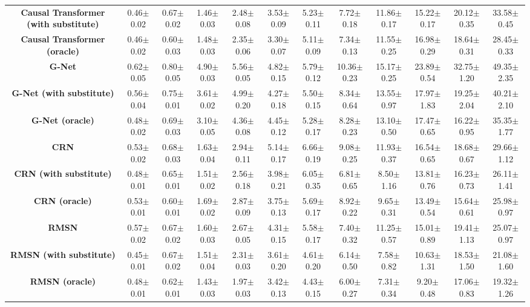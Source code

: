 \documentclass[10pt]{article} %
\begin{document}
\begin{table}[!htbp]
{\begin{tabular}{|c|c|c|c|c|c|c|c|c|c|c|c|}
\textbf{Causal Transformer (with substitute)} &  0.46$\pm$0.02 & 0.67$\pm$0.02& 1.46$\pm$0.03& 2.48$\pm$0.08& 3.53$\pm$0.09& 5.23$\pm$0.11& 7.72$\pm$0.18& 11.86$\pm$0.17& 15.22$\pm$0.17& 20.12$\pm$0.35& 33.58$\pm$0.45\\


\textbf{Causal Transformer (oracle)} & 0.46$\pm$0.02&  0.60$\pm$0.03 & 1.48$\pm$0.03 & 2.35$\pm$ 0.06& 3.30$\pm$0.07& 5.11$\pm$0.09& 7.34$\pm$0.13& 11.55$\pm$0.25& 16.98$\pm$0.29& 18.64$\pm$0.31& 28.45$\pm$0.33\\

 \hline
\textbf{G-Net} & 0.62$\pm$0.05&  0.80$\pm$0.05& 4.90$\pm$0.03& 5.56$\pm$0.05& 4.82$\pm$0.15& 5.79$\pm$0.12& 10.36$\pm$0.23& 15.17$\pm$0.25& 23.89$\pm$0.54& 32.75$\pm$1.20& 49.35$\pm$2.35\\

\textbf{G-Net (with substitute)} & 0.56$\pm$0.04&  0.75$\pm$0.01& 3.61$\pm$0.02& 4.99$\pm$0.20& 4.27$\pm$0.18& 5.50$\pm$0.15& 8.34$\pm$0.64& 13.55$\pm$0.97& 17.97$\pm$1.83& 19.25$\pm$2.04& 40.21$\pm$2.10\\

\textbf{G-Net (oracle)} & 0.48$\pm$0.02& 0.69$\pm$0.03& 3.10$\pm$0.05& 4.36$\pm$0.08& 4.45$\pm$0.12& 5.28$\pm$0.17& 8.28$\pm$0.23& 13.10$\pm$0.50& 17.47$\pm$0.65& 16.22$\pm$0.95& 35.35$\pm$1.77\\
 \hline

 
\textbf{CRN} & 0.53$\pm$0.02& 0.68$\pm$0.03& 1.63$\pm$0.04& 2.94$\pm$0.11& 5.14$\pm$0.17& 6.66$\pm$0.19& 9.08$\pm$0.25& 11.93$\pm$0.37& 16.54$\pm$0.65& 18.68$\pm$0.67& 29.66$\pm$1.12\\

\textbf{CRN (with substitute)} & 0.48$\pm$0.01& 0.65$\pm$0.01& 1.51$\pm$0.02& 2.56$\pm$0.18 & 3.98$\pm$0.21 & 6.05$\pm$0.35 & 6.81$\pm$0.65 & 8.50$\pm$1.16 & 13.81$\pm$0.76 & 16.23$\pm$0.73 & 26.11$\pm$1.41 \\

\textbf{CRN (oracle)} & 0.53$\pm$0.01& 0.60$\pm$0.01& 1.69$\pm$0.02& 2.87$\pm$0.09& 3.75$\pm$0.13& 5.69$\pm$0.17& 8.92$\pm$0.22& 9.65$\pm$0.31& 13.49$\pm$0.54& 15.64$\pm$0.61& 25.98$\pm$0.97\\

 \hline
\textbf{RMSN} & 0.57$\pm$0.02& 0.67$\pm$0.02& 1.60$\pm$0.03& 2.67$\pm$0.05& 4.31$\pm$0.15& 5.58$\pm$0.17& 7.40$\pm$0.32& 11.25$\pm$0.57& 15.01$\pm$0.89& 19.41$\pm$1.13& 25.07$\pm$0.97\\

\textbf{RMSN (with substitute)} & 0.45$\pm$0.01& 0.67$\pm$0.02& 1.51$\pm$0.04 & 2.31$\pm$0.03& 3.61$\pm$0.20& 4.61$\pm$0.20& 6.14$\pm$0.50& 7.58$\pm$0.82& 10.63$\pm$1.31& 18.53$\pm$1.50& 21.08$\pm$1.60\\

\textbf{RMSN (oracle)} & 0.48$\pm$0.01& 0.62$\pm$0.01& 1.43$\pm$0.03& 1.97$\pm$0.03& 3.42$\pm$0.13& 4.43$\pm$0.15& 6.00$\pm$0.27& 7.31$\pm$0.34& 9.20$\pm$0.48& 17.06$\pm$0.83& 19.32$\pm$1.26\\
 \hline
 \end{tabular}%
}
\label{tab:perf_sim_combined}
\end{table}
\end{document}
